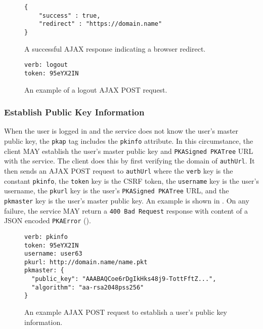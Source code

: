 \documentclass{article}
\begin{document}
\begin{figure}
\begin{lstlisting}
{
    "success" : true,
    "redirect" : "https://domain.name"
}
\end{lstlisting}
\caption{A successful AJAX response indicating a browser redirect.}
\label{fig:logout_redirect}
\end{figure}

\begin{figure}
\begin{lstlisting}
verb: logout
token: 95eYX2IN
\end{lstlisting}
\caption{An example of a logout AJAX POST request.}
\label{fig:logout_req}
\end{figure}

\subsubsection{Establish Public Key Information}

When the user is logged in and the service does not know the user's master public key, the \texttt{pkap} tag includes the \texttt{pkinfo} attribute. 
In this circumstance, the client MAY establish the user's master public key and \texttt{PKASigned PKATree} URL with the service. 
The client does this by first verifying the domain of \texttt{authUrl}.
It then sends an AJAX POST request to \texttt{authUrl} where the \texttt{verb} key is the constant \texttt{pkinfo}, the \texttt{token} key is the CSRF token, the \texttt{username} key is the user's username, the \texttt{pkurl} key is the user's \texttt{PKASigned PKATree} URL, and the \texttt{pkmaster} key is the user's master public key. 
An example is shown in . 
On any failure, the service MAY return a \texttt{400 Bad Request} response with content of a JSON encoded \texttt{PKAError} (). 

\begin{figure}
\begin{lstlisting}
verb: pkinfo
token: 95eYX2IN
username: user63
pkurl: http://domain.name/name.pkt
pkmaster: {
  "public_key": "AAABAQCoe6rDgIkHks48j9-TottFftZ...",
  "algorithm": "aa-rsa2048pss256"
}
\end{lstlisting}
\caption{An example AJAX POST request to establish a user's public key information.}
\label{example:establish:pkinfo}
\end{figure}
\end{document}
